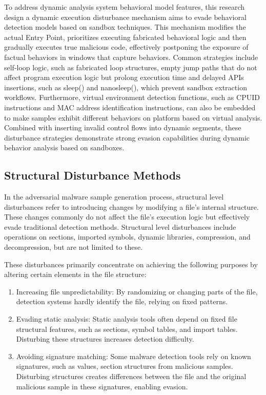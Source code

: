 To address dynamic analysis system behavioral model features, this research design a dynamic execution disturbance mechanism aims to evade behavioral detection models based on sandbox techniques. This mechanism modifies the actual Entry Point, prioritizes executing fabricated behavioral logic and then gradually executes true malicious code, effectively postponing the exposure of factual behaviors in windows that capture behaviors. Common strategies include self-loop logic, such as fabricated loop structures, empty jump paths that do not affect program execution logic but prolong execution time and delayed APIs insertions, such as sleep() and nanosleep(), which prevent sandbox extraction workflows. Furthermore, virtual environment detection functions, such as CPUID instructions and MAC address identification instructions, can also be embedded to make samples exhibit different behaviors on platform based on virtual analysis. Combined with inserting invalid control flows into dynamic segments, these disturbance strategies demonstrate strong evasion capabilities during dynamic behavior analysis based on sandboxes.

\subsection{Structural Disturbance Methods}

In the adversarial malware sample generation process, structural level disturbances refer to introducing changes by modifying a file's internal structure. These changes commonly do not affect the file's execution logic but effectively evade traditional detection methods. Structural level disturbances include operations on sections, imported symbols, dynamic libraries, compression, and decompression, but are not limited to these.

These disturbances primarily concentrate on achieving the following purposes by altering certain elements in the file structure:

\begin{enumerate}
	 
\item Increasing file unpredictability: By randomizing or changing parts of the file, detection systems hardly identify the file, relying on fixed patterns.

\item Evading static analysis: Static analysis tools often depend on fixed file structural features, such as sections, symbol tables, and import tables. Disturbing these structures increases detection difficulty.

\item Avoiding signature matching: Some malware detection tools rely on known signatures, such as values, section structures from malicious samples. Disturbing structures creates differences between the file and the original malicious sample in these signatures, enabling evasion.
\end{enumerate}

